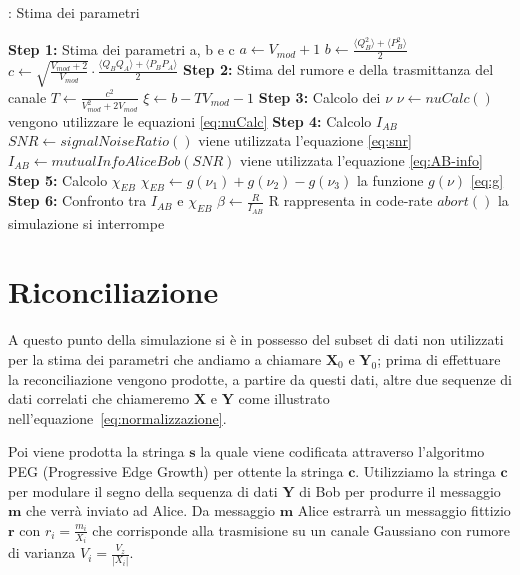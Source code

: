 \begin{algorithm}[H]
\caption{: Stima dei parametri}\label{al:stima-param}
\begin{algorithmic}[1]
\State \textbf{Step 1:} Stima dei parametri a, b e c \newline
	$a \leftarrow V_{mod} + 1$ \newline
	$b \leftarrow \frac{\langle Q_B^2 \rangle + \langle P_B^2\rangle}{2} $ \newline
	$c \leftarrow \sqrt{\frac{V_{mod} + 2}{V_{mod}}} \cdot \frac{\langle Q_BQ_A \rangle + \langle P_BP_A\rangle}{2}$ 
\State \textbf{Step 2:} Stima del rumore e della trasmittanza del canale \newline
	$T \leftarrow \frac{c^2}{V_{mod}^2 + 2 V_{mod}}$ \newline
	$\xi \leftarrow b - TV_{mod} -1 $ 
\State \textbf{Step 3:} Calcolo dei $\nu$ \newline
	$\textbf{$\nu$} \leftarrow nuCalc()$  		 \Comment vengono utilizzare le equazioni \ref{eq:nuCalc}
\State \textbf{Step 4:} Calcolo $I_{AB}$ \newline
	$SNR \leftarrow signalNoiseRatio()$	\Comment viene utilizzata l'equazione \ref{eq:snr}	
	$I_{AB} \leftarrow mutualInfoAliceBob(SNR)$	\Comment viene utilizzata l'equazione \ref{eq:AB-info}
\State \textbf{Step 5:} Calcolo $\chi_{EB}$ \newline
	$\chi_{EB} \leftarrow g(\nu_1) + g(\nu_2) - g(\nu_3)$	\Comment la funzione $g(\nu)$ \ref{eq:g}						
\State \textbf{Step 6:} Confronto tra $I_{AB}$ e $\chi_{EB}$  \newline
	$\beta \leftarrow \frac{R}{I_{AB}}$	\Comment R rappresenta in code-rate
		\State	$abort()$		\Comment la simulazione si interrompe
	\EndIf
\end{algorithmic}
\end{algorithm}


\section{Riconciliazione}
A questo punto della simulazione si \`e in possesso del subset di dati non utilizzati per la stima dei parametri che andiamo a chiamare $\textbf{X}_0$ e $\textbf{Y}_0$; prima di effettuare la reconciliazione vengono prodotte, a partire da questi dati, altre due sequenze di dati correlati che chiameremo $\textbf{X}$ e $\textbf{Y}$ come illustrato nell'equazione~\ref{eq:normalizzazione}. 

Poi viene prodotta la stringa $\textbf{s}$ la quale viene codificata attraverso l'algoritmo PEG (Progressive Edge Growth) per ottente la stringa $\textbf{c}$. Utilizziamo la stringa $\textbf{c}$ per modulare il segno della sequenza di dati $\textbf{Y}$ di Bob per produrre il messaggio  $\textbf{m}$ che verr\`a inviato ad Alice. Da messaggio  $\textbf{m}$ Alice estrarr\`a un messaggio fittizio $\textbf{r}$ con $r_i = \frac{m_i}{X_i}$ che corrisponde alla trasmisione su un canale Gaussiano con rumore di varianza $V_i = \frac{V_z}{|X_i|}$.

